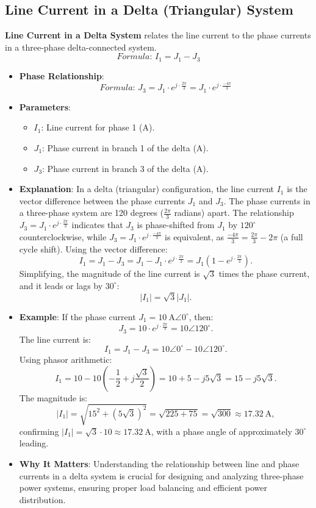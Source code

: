 \documentclass[12pt]{article}
\newcommand{\concept}[1]{\textbf{#1}}
\newcommand{\formula}[1]{\textit{Formula: }#1}
\begin{document}
\subsection{Line Current in a Delta (Triangular) System}
\concept{Line Current in a Delta System} relates the line current to the phase currents in a three-phase delta-connected system.
\[
\formula{I_1 = J_1 - J_3}
\]
\begin{itemize}
    \item \textbf{Phase Relationship}:
        \[
        \formula{J_3 = J_1 \cdot e^{j \cdot \frac{2\pi}{3}} = J_1 \cdot e^{j \cdot \frac{-4\pi}{3}}}
        \]
    \item \textbf{Parameters}:
        \begin{itemize}
            \item \(I_1\): Line current for phase 1 (\si{\ampere}).
            \item \(J_1\): Phase current in branch 1 of the delta (\si{\ampere}).
            \item \(J_3\): Phase current in branch 3 of the delta (\si{\ampere}).
        \end{itemize}
    \item \textbf{Explanation}: In a delta (triangular) configuration, the line current \(I_1\) is the vector difference between the phase currents \(J_1\) and \(J_3\). The phase currents in a three-phase system are 120 degrees (\(\frac{2\pi}{3}\) radians) apart. The relationship \(J_3 = J_1 \cdot e^{j \cdot \frac{2\pi}{3}}\) indicates that \(J_3\) is phase-shifted from \(J_1\) by \(120^\circ\) counterclockwise, while \(J_3 = J_1 \cdot e^{j \cdot \frac{-4\pi}{3}}\) is equivalent, as \(\frac{-4\pi}{3} = \frac{2\pi}{3} - 2\pi\) (a full cycle shift). Using the vector difference:
        \[
        I_1 = J_1 - J_3 = J_1 - J_1 \cdot e^{j \cdot \frac{2\pi}{3}} = J_1 (1 - e^{j \cdot \frac{2\pi}{3}}).
        \]
        Simplifying, the magnitude of the line current is \(\sqrt{3}\) times the phase current, and it leads or lags by \(30^\circ\):
        \[
        |I_1| = \sqrt{3} |J_1|.
        \]
    \item \textbf{Example}: If the phase current \(J_1 = \SI{10}{\ampere} \angle 0^\circ\), then:
        \[
        J_3 = 10 \cdot e^{j \cdot \frac{2\pi}{3}} = 10 \angle 120^\circ.
        \]
        The line current is:
        \[
        I_1 = J_1 - J_3 = 10 \angle 0^\circ - 10 \angle 120^\circ.
        \]
        Using phasor arithmetic:
        \[
        I_1 = 10 - 10 \left(-\frac{1}{2} + j \frac{\sqrt{3}}{2}\right) = 10 + 5 - j 5\sqrt{3} = 15 - j 5\sqrt{3}.
        \]
        The magnitude is:
        \[
        |I_1| = \sqrt{15^2 + (5\sqrt{3})^2} = \sqrt{225 + 75} = \sqrt{300} \approx \SI{17.32}{\ampere},
        \]
        confirming \(|I_1| = \sqrt{3} \cdot 10 \approx \SI{17.32}{\ampere}\), with a phase angle of approximately \(30^\circ\) leading.
    \item \textbf{Why It Matters}: Understanding the relationship between line and phase currents in a delta system is crucial for designing and analyzing three-phase power systems, ensuring proper load balancing and efficient power distribution.
\end{itemize}
\end{document}
